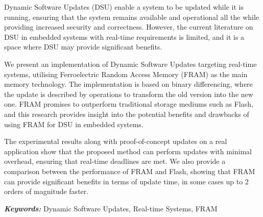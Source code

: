 Dynamic Software Updates (DSU) enable a system to be updated while it is running, ensuring that the system remains available and operational all the while providing increased security and correctness. However, the current literature on DSU in embedded systems with real-time requirements is limited, and it is a space where DSU may provide significant benefits. 

We present an implementation of Dynamic Software Updates targeting real-time systems, utilising Ferroelectric Random Access Memory (FRAM) as the main memory technology. The implementation is based on binary differencing, where the update is described by operations to transform the old version into the new one. FRAM promises to outperform traditional storage mediums such as Flash, and this research provides insight into the potential benefits and drawbacks of using FRAM for DSU in embedded systems. 

The experimental results along with proof-of-concept updates on a real application show that the proposed method can perform updates with minimal overhead, ensuring that real-time deadlines are met. We also provide a comparison between the performance of FRAM and Flash, showing that FRAM can provide significant benefits in terms of update time, in some cases up to 2 orders of magnitude faster.

\textbf{\textit{Keywords:}} Dynamic Software Updates, Real-time Systems, FRAM
